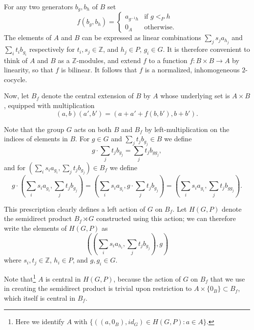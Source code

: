 \documentclass{amsart}
\theoremstyle{definition}
\theoremstyle{remark}
\begin{document}
For any two generators \(b_g, b_h \)  of \(B\) set
\[
f(b_g, b_h) =
\begin{cases}
    a_{g^{-1}h} &\text{if \(g<_Ph\)}\\
    0_A &\text{otherwise}.
\end{cases}
\]
The elements of $A$ and \(B\) can be expressed as linear combinations $\sum_j s_ja_{h_j}$ and \(\sum_i t_ib_{g_i}\) respectively for \(t_i, s_j\in \mathbb{Z}\), and $h_j \in P$,  \(g_i \in G\). It is therefore convenient to think of $A$ and \(B\) as a \(\mathbb{Z}\)-modules, and extend \(f\) to a function \(f  \colon B\times B \to A\) by linearity, so that \(f\) is bilinear. It follows that \(f\) is a normalized, inhomogeneous $2$-cocycle.

Now, let $B_f$ denote the central extension of $B$ by $A$ whose underlying set is $A \times B$, equipped with multiplication
\[ (a, b)(a',b') = (a+a'+f(b,b'), b+b').
\]

Note that the group \(G\) acts on both $B$ and $B_f$
by left-multiplication on the indices of elements in $B$.
For \(g\in G\) and $\sum_j t_jb_{g_j} \in B$ we define
\[ g \cdot \sum_j t_jb_{g_j} = \sum_j t_jb_{gg_j},
\]
and for \(\left(\sum_i s_ia_{g_i}, \sum_j t_jb_{g_j}\right) \in B_f\) we define
\[ g 
\cdot\left(\sum_i s_ia_{g_i}, \sum_j t_jb_{g_j}\right) = \left(\sum_i s_ia_{g_i}, g \cdot \sum_j t_jb_{g_j}\right) = \left(\sum_i s_ia_{g_i}, \sum_j t_jb_{g g_j}\right).
\]

This prescription clearly defines a left action of $G$ on $B_f$.  Let $H(G, P)$ denote the semidirect product $B_f \rtimes G$ constructed using this action; we can therefore write the elements of $H(G,P)$ as
\[
\left(\left(\sum_i s_i a_{h_i} , \sum_j t_j b_{g_j} \right), g \right)
\]
where $s_i, t_j \in \mathbb{Z}$, $h_i \in P$, and $g, g_i \in G$.


Note that\footnote{Here we identify \(A\) with \(\{((a,0_B), id_G)\in H(G,P):a\in A\}\).} \(A\) is central in \(H(G,P)\),
because the action of \(G\) on \(B_f\) that we use in creating the semidirect product is
trivial upon restriction to \(A \times \{ 0_B \} \subset B_f \), which itself is central in \(B_f\). 
\end{document}
